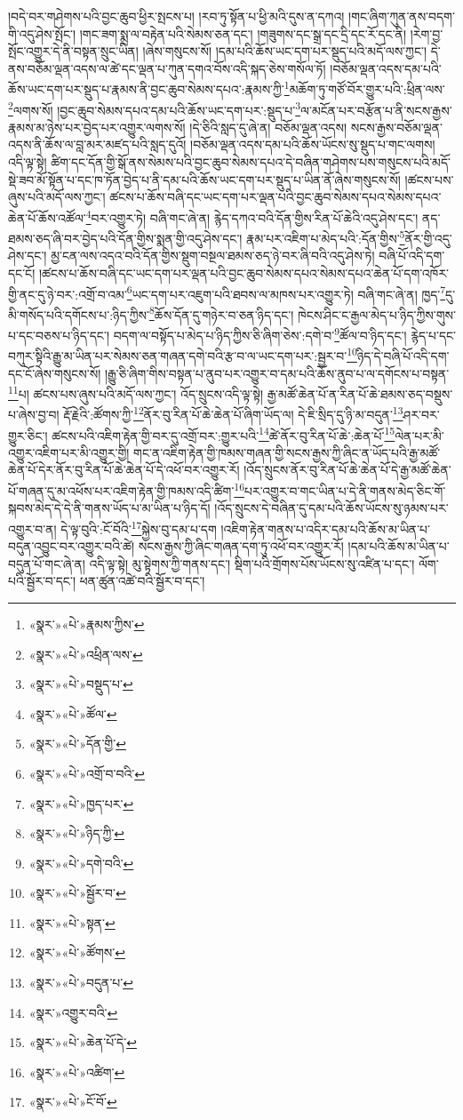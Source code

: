 །བདེ་བར་གཤེགས་པའི་བྱང་ཆུབ་ཕྱིར་སྤངས་པ། །རབ་ཏུ་སྟོན་པ་ཕྱི་མའི་དུས་ན་དཀའ། །གང་ཞིག་ཀུན་ནས་བདག་གི་འདུ་ཤེས་སྤོང་། །གང་ཟག་སྨྲ་ལ་བརྟེན་པའི་སེམས་ཅན་དང་། །གཟུགས་དང་སྒྲ་དང་དྲི་དང་རོ་དང་ནི། །རེག་བྱ་སྤོང་འགྱུར་དེ་ནི་བསྟན་སྲུང་ཡིན། །ཞེས་གསུངས་སོ། །དམ་པའི་ཆོས་ཡང་དག་པར་སྡུད་པའི་མདོ་ལས་ཀྱང་། དེ་ནས་བཅོམ་ལྡན་འདས་ལ་ཚེ་དང་ལྡན་པ་ཀུན་དགའ་བོས་འདི་སྐད་ཅེས་གསོལ་ཏོ། །བཅོམ་ལྡན་འདས་དམ་པའི་ཆོས་ཡང་དག་པར་སྡུད་པ་རྣམས་ནི་བྱང་ཆུབ་སེམས་དཔའ་:རྣམས་ཀྱི་\footnote{«སྣར་»«པེ་»རྣམས་ཀྱིས་}མཆོག་ཏུ་གཙོ་བོར་གྱུར་པའི་:ཕྲིན་ལས་\footnote{«སྣར་»«པེ་»འཕྲིན་ལས་}ལགས་སོ། །བྱང་ཆུབ་སེམས་དཔའ་དམ་པའི་ཆོས་ཡང་དག་པར་:སྡུད་པ་\footnote{«སྣར་»«པེ་»བསྡུད་པ་}ལ་མངོན་པར་བརྩོན་པ་ནི་སངས་རྒྱས་རྣམས་མ་ཉེས་པར་བྱེད་པར་འགྱུར་ལགས་སོ། །དེ་ཅིའི་སླད་དུ་ཞེ་ན། བཅོམ་ལྡན་འདས། སངས་རྒྱས་བཅོམ་ལྡན་འདས་ནི་ཆོས་ལ་བླ་མར་མཛད་པའི་སླད་དུའོ། །བཅོམ་ལྡན་འདས་དམ་པའི་ཆོས་ཡོངས་སུ་སྡུད་པ་གང་ལགས། འདི་ལྟ་སྟེ། ཚིག་དང་དོན་གྱི་སྒོ་ནས་སེམས་པའི་བྱང་ཆུབ་སེམས་དཔའ་དེ་བཞིན་གཤེགས་པས་གསུངས་པའི་མདོ་སྡེ་ཟབ་མོ་སྟོན་པ་དང་ཁ་ཏོན་བྱེད་པ་ནི་དམ་པའི་ཆོས་ཡང་དག་པར་སྡུད་པ་ཡིན་ནོ་ཞེས་གསུངས་སོ། །ཚངས་པས་ཞུས་པའི་མདོ་ལས་ཀྱང་། ཚངས་པ་ཆོས་བཞི་དང་ཡང་དག་པར་ལྡན་པའི་བྱང་ཆུབ་སེམས་དཔའ་སེམས་དཔའ་ཆེན་པོ་ཆོས་འཚོལ་\footnote{«སྣར་»«པེ་»ཚོལ་}བར་འགྱུར་ཏེ། བཞི་གང་ཞེ་ན། རྙེད་དཀའ་བའི་དོན་གྱིས་རིན་པོ་ཆེའི་འདུ་ཤེས་དང་། ནད་ཐམས་ཅད་ཞི་བར་བྱེད་པའི་དོན་གྱིས་སྨན་གྱི་འདུ་ཤེས་དང་། རྣམ་པར་འཇིག་པ་མེད་པའི་:དོན་གྱིས་\footnote{«སྣར་»«པེ་»དོན་གྱི་}ནོར་གྱི་འདུ་ཤེས་དང་། མྱ་ངན་ལས་འདའ་བའི་དོན་གྱིས་སྡུག་བསྔལ་ཐམས་ཅད་ཉེ་བར་ཞི་བའི་འདུ་ཤེས་ཏེ། བཞི་པོ་འདི་དག་དང་ངོ། །ཚངས་པ་ཆོས་བཞི་དང་ཡང་དག་པར་ལྡན་པའི་བྱང་ཆུབ་སེམས་དཔའ་སེམས་དཔའ་ཆེན་པོ་དག་འཁོར་གྱི་ནང་དུ་ཉེ་བར་:འགྲོ་བ་འམ་\footnote{«སྣར་»«པེ་»འགྲོ་བ་བའི་}ཡང་དག་པར་འཇུག་པའི་ཐབས་ལ་མཁས་པར་འགྱུར་ཏེ། བཞི་གང་ཞེ་ན། ཁྱད་\footnote{«སྣར་»«པེ་»ཁྱད་པར་}དུ་མི་གསོད་པའི་དགོངས་པ་:ཉིད་ཀྱིས་\footnote{«སྣར་»«པེ་»ཉིད་ཀྱི་}ཆོས་དོན་དུ་གཉེར་བ་ཅན་ཉིད་དང་། ཁེངས་ཤིང་ང་རྒྱལ་མེད་པ་ཉིད་ཀྱིས་གུས་པ་དང་བཅས་པ་ཉིད་དང་། བདག་ལ་བསྟོད་པ་མེད་པ་ཉིད་ཀྱིས་ཅི་ཞིག་ཅེས་:དགེ་བ་\footnote{«སྣར་»«པེ་»དགེ་བའི་}ཚོལ་བ་ཉིད་དང་། རྙེད་པ་དང་བཀུར་སྟིའི་རྒྱུ་མ་ཡིན་པར་སེམས་ཅན་གཞན་དགེ་བའི་རྩ་བ་ལ་ཡང་དག་པར་:སྦྱར་བ་\footnote{«སྣར་»«པེ་»སྦྱོར་བ་}ཉིད་དེ་བཞི་པོ་འདི་དག་དང་ངོ་ཞེས་གསུངས་སོ། །རྒྱུ་ཅི་ཞིག་གིས་བསྟན་པ་ནུབ་པར་འགྱུར་བ་དམ་པའི་ཆོས་ནུབ་པ་ལ་དགོངས་པ་བསྟན་\footnote{«སྣར་»«པེ་»སྟན་}པ། ཚངས་པས་ཞུས་པའི་མདོ་ལས་ཀྱང་། འོད་སྲུངས་འདི་ལྟ་སྟེ། རྒྱ་མཚོ་ཆེན་པོ་ན་རིན་པོ་ཆེ་ཐམས་ཅད་བསྡུས་པ་ཞེས་བྱ་བ། རྡོ་རྗེའི་:ཚོགས་ཀྱི་\footnote{«སྣར་»«པེ་»ཚོགས་}ནོར་བུ་རིན་པོ་ཆེ་ཆེན་པོ་ཞིག་ཡོད་ལ། དེ་ཇི་སྲིད་དུ་ཉི་མ་བདུན་\footnote{«སྣར་»«པེ་»བདུན་པ་}ཤར་བར་གྱུར་ཅིང་། ཚངས་པའི་འཇིག་རྟེན་གྱི་བར་དུ་འགྲོ་བར་:གྱུར་པའི་\footnote{«སྣར་»འགྱུར་བའི་}ཚེ་ནོར་བུ་རིན་པོ་ཆེ་:ཆེན་པོ་\footnote{«སྣར་»«པེ་»ཆེན་པོ་དེ་}ལེན་པར་མི་འགྱུར་འཇིག་པར་མི་འགྱུར་གྱི། གང་ན་འཇིག་རྟེན་གྱི་ཁམས་གཞན་གྱི་སངས་རྒྱས་ཀྱི་ཞིང་ན་ཡོད་པའི་རྒྱ་མཚོ་ཆེན་པོ་དེར་ནོར་བུ་རིན་པོ་ཆེ་ཆེན་པོ་དེ་འཕོ་བར་འགྱུར་རོ། །འོད་སྲུངས་ནོར་བུ་རིན་པོ་ཆེ་ཆེན་པོ་དེ་རྒྱ་མཚོ་ཆེན་པོ་གཞན་དུ་མ་འཕོས་པར་འཇིག་རྟེན་གྱི་ཁམས་འདི་ཚིག་\footnote{«སྣར་»«པེ་»འཚིག་}པར་འགྱུར་བ་གང་ཡིན་པ་དེ་ནི་གནས་མེད་ཅིང་གོ་སྐབས་མེད་དེ་དེ་ནི་གནས་ཡོད་པ་མ་ཡིན་པ་ཉིད་དོ། །འོད་སྲུངས་དེ་བཞིན་དུ་དམ་པའི་ཆོས་ཡོངས་སུ་ཉམས་པར་འགྱུར་བ་ན། དེ་ལྟ་བུའི་:ངོ་བོའི་\footnote{«སྣར་»«པེ་»ངོ་བོ་}སྐྱེས་བུ་དམ་པ་དག །འཇིག་རྟེན་གནས་པ་འདིར་དམ་པའི་ཆོས་མ་ཡིན་པ་བདུན་འབྱུང་བར་འགྱུར་བའི་ཚེ། སངས་རྒྱས་ཀྱི་ཞིང་གཞན་དག་ཏུ་འཕོ་བར་འགྱུར་རོ། །དམ་པའི་ཆོས་མ་ཡིན་པ་བདུན་པོ་གང་ཞེ་ན། འདི་ལྟ་སྟེ། མུ་སྟེགས་ཀྱི་གནས་དང་། སྡིག་པའི་གྲོགས་པོས་ཡོངས་སུ་འཛིན་པ་དང་། ལོག་པའི་སྦྱོར་བ་དང་། ཕན་ཚུན་འཚེ་བའི་སྦྱོར་བ་དང་། 